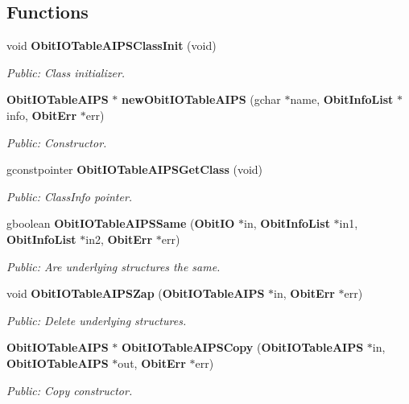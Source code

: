 \subsection*{Functions}
\begin{CompactItemize}
\item 
void {\bf Obit\-IOTable\-AIPSClass\-Init} (void)
\begin{CompactList}\small\item\em Public: Class initializer. \item\end{CompactList}\item 
{\bf Obit\-IOTable\-AIPS} $\ast$ {\bf new\-Obit\-IOTable\-AIPS} (gchar $\ast$name, {\bf Obit\-Info\-List} $\ast$info, {\bf Obit\-Err} $\ast$err)
\begin{CompactList}\small\item\em Public: Constructor. \item\end{CompactList}\item 
gconstpointer {\bf Obit\-IOTable\-AIPSGet\-Class} (void)
\begin{CompactList}\small\item\em Public: Class\-Info pointer. \item\end{CompactList}\item 
gboolean {\bf Obit\-IOTable\-AIPSSame} ({\bf Obit\-IO} $\ast$in, {\bf Obit\-Info\-List} $\ast$in1, {\bf Obit\-Info\-List} $\ast$in2, {\bf Obit\-Err} $\ast$err)
\begin{CompactList}\small\item\em Public: Are underlying structures the same. \item\end{CompactList}\item 
void {\bf Obit\-IOTable\-AIPSZap} ({\bf Obit\-IOTable\-AIPS} $\ast$in, {\bf Obit\-Err} $\ast$err)
\begin{CompactList}\small\item\em Public: Delete underlying structures. \item\end{CompactList}\item 
{\bf Obit\-IOTable\-AIPS} $\ast$ {\bf Obit\-IOTable\-AIPSCopy} ({\bf Obit\-IOTable\-AIPS} $\ast$in, {\bf Obit\-IOTable\-AIPS} $\ast$out, {\bf Obit\-Err} $\ast$err)
\begin{CompactList}\small\item\em Public: Copy constructor. \item\end{CompactList}\item 

\end{CompactItemize}
